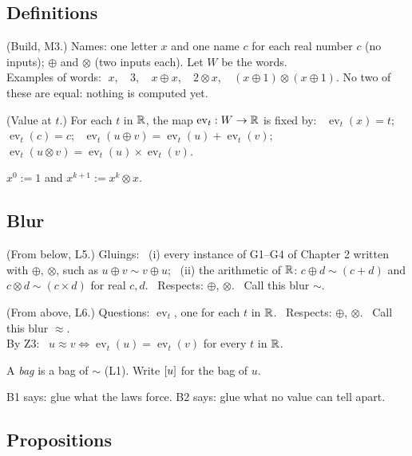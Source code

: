 \subsection*{Definitions}

\begin{lines}
\item[\lab{D1}] (Build, M3.) Names: one letter $x$ and one name $c$ for each real number $c$ (no inputs); $\oplus$ and $\otimes$ (two inputs each). Let $W$ be the words. \\
Examples of words: $\;x$, \ $\;3$, \ $\;x \oplus x$, \ $\;2 \otimes x$, \ $\;(x \oplus 1) \otimes (x \oplus 1)$. No two of these are equal: nothing is computed yet.
\item[\lab{D2}] (Value at $t$.) For each $t$ in $\mathbb{R}$, the map $\operatorname{ev}_t : W \to \mathbb{R}$ is fixed by: \ $\operatorname{ev}_t(x) = t$; \ $\operatorname{ev}_t(c) = c$; \ $\operatorname{ev}_t(u \oplus v) = \operatorname{ev}_t(u) + \operatorname{ev}_t(v)$; \ $\operatorname{ev}_t(u \otimes v) = \operatorname{ev}_t(u) \times \operatorname{ev}_t(v)$.
\item[\lab{D3}] $x^0 := 1$ and $x^{k+1} := x^k \otimes x$.
\end{lines}

\subsection*{Blur}

\begin{lines}
\item[\lab{B1}] (From below, L5.) Gluings: \ (i) every instance of G1--G4 of Chapter 2 written with $\oplus$, $\otimes$, such as $u \oplus v \sim v \oplus u$; \ (ii) the arithmetic of $\mathbb{R}$: $c \oplus d \sim (c + d)$ and $c \otimes d \sim (c \times d)$ for real $c, d$. \ Respects: $\oplus$, $\otimes$. \ Call this blur $\sim$.
\item[\lab{B2}] (From above, L6.) Questions: $\operatorname{ev}_t$, one for each $t$ in $\mathbb{R}$. \ Respects: $\oplus$, $\otimes$. \ Call this blur $\approx$. \\
By Z3: \ $u \approx v \iff \operatorname{ev}_t(u) = \operatorname{ev}_t(v)$ for every $t$ in $\mathbb{R}$.
\item[] A \emph{bag} is a bag of $\sim$ (L1). Write $[u]$ for the bag of $u$.
\end{lines}
B1 says: glue what the laws force. B2 says: glue what no value can tell apart.

\subsection*{Propositions}

